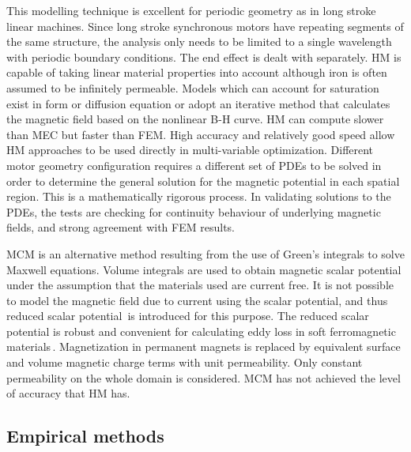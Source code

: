         
        This modelling technique is excellent for periodic geometry as in long stroke linear machines. Since long stroke synchronous motors have repeating segments of the same structure, the analysis only needs to be limited to a single wavelength with periodic boundary conditions. The end effect is dealt with separately. \acs{HM} is capable of taking linear material properties into account although iron is often assumed to be infinitely permeable. Models which can account for saturation exist in form or diffusion equation or adopt an iterative method that calculates the magnetic field based on the nonlinear B-H curve. \acs{HM} can compute slower than \acs{MEC} but faster than \acs{FEM}. High accuracy and relatively good speed allow HM approaches to be used directly in multi-variable optimization. Different motor geometry configuration requires a different set of \acsp{PDE} to be solved in order to determine the general solution for the magnetic potential in each spatial region. This is a mathematically rigorous process. In validating solutions to the \acsp{PDE}, the tests are checking for continuity behaviour of underlying magnetic fields, and strong agreement with \acs{FEM} results.
        
        
        \ac{MCM} is an alternative method resulting from the use of Green’s integrals to solve Maxwell equations. Volume integrals are used to obtain magnetic scalar potential under the assumption that the materials used are current free. It is not possible to model the magnetic field due to current using the scalar potential, and thus reduced scalar potential\,\cite{Gong2009AnalysisMethod} is introduced for this purpose. The reduced scalar potential is robust and convenient for calculating eddy loss in soft ferromagnetic materials\,\cite{Xu2004TotalCalculation,Bowler1987EddyFunctions,Rubinacci2004AComputation}. Magnetization in permanent magnets is replaced by equivalent surface and volume magnetic charge terms with unit permeability. Only constant permeability on the whole domain is considered. \acs{MCM} has not achieved the level of accuracy that \acs{HM} has.
        
    
    \subsection{Empirical methods}                  \label{Chapter:background/modelling techniques for designing motors/empirical methods}


